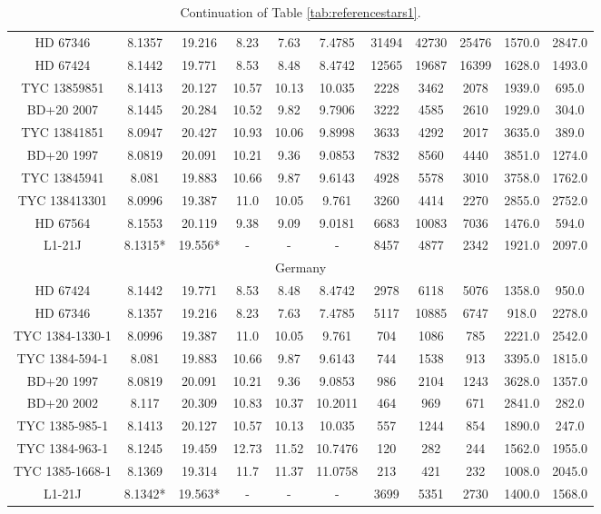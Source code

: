 \begin{table*}
{\begin{tabular}{c|cc|ccc|ccc|cc}
HD 67346 & 8.1357 & 19.216 & 8.23 & 7.63 & 7.4785 & 31494 & 42730 & 25476 & 1570.0 & 2847.0\\HD 67424 & 8.1442 & 19.771 & 8.53 & 8.48 & 8.4742 & 12565 & 19687 & 16399 & 1628.0 & 1493.0\\TYC 13859851 & 8.1413 & 20.127 & 10.57 & 10.13 & 10.035 & 2228 & 3462 & 2078 & 1939.0 & 695.0\\BD+20 2007 & 8.1445 & 20.284 & 10.52 & 9.82 & 9.7906 & 3222 & 4585 & 2610 & 1929.0 & 304.0\\TYC 13841851 & 8.0947 & 20.427 & 10.93 & 10.06 & 9.8998 & 3633 & 4292 & 2017 & 3635.0 & 389.0\\BD+20 1997 & 8.0819 & 20.091 & 10.21 & 9.36 & 9.0853 & 7832 & 8560 & 4440 & 3851.0 & 1274.0\\TYC 13845941 & 8.081 & 19.883 & 10.66 & 9.87 & 9.6143 & 4928 & 5578 & 3010 & 3758.0 & 1762.0\\TYC 138413301 & 8.0996 & 19.387 & 11.0 & 10.05 & 9.761 & 3260 & 4414 & 2270 & 2855.0 & 2752.0\\HD 67564 & 8.1553 & 20.119 & 9.38 & 9.09 & 9.0181 & 6683 & 10083 & 7036 & 1476.0 & 594.0\\L1-21J & 8.1315* & 19.556* & - & - & - & 8457 & 4877 & 2342 & 1921.0 & 2097.0\\
\hline
\multicolumn{11}{c}{Germany}\\
\hline
HD 67424 & 8.1442 & 19.771 & 8.53 & 8.48 & 8.4742 & 2978 & 6118 & 5076 & 1358.0 & 950.0\\HD 67346 & 8.1357 & 19.216 & 8.23 & 7.63 & 7.4785 & 5117 & 10885 & 6747 & 918.0 & 2278.0\\TYC 1384-1330-1 & 8.0996 & 19.387 & 11.0 & 10.05 & 9.761 & 704 & 1086 & 785 & 2221.0 & 2542.0\\TYC 1384-594-1 & 8.081 & 19.883 & 10.66 & 9.87 & 9.6143 & 744 & 1538 & 913 & 3395.0 & 1815.0\\BD+20 1997 & 8.0819 & 20.091 & 10.21 & 9.36 & 9.0853 & 986 & 2104 & 1243 & 3628.0 & 1357.0\\BD+20 2002 & 8.117 & 20.309 & 10.83 & 10.37 & 10.2011 & 464 & 969 & 671 & 2841.0 & 282.0\\TYC 1385-985-1 & 8.1413 & 20.127 & 10.57 & 10.13 & 10.035 & 557 & 1244 & 854 & 1890.0 & 247.0\\TYC 1384-963-1 & 8.1245 & 19.459 & 12.73 & 11.52 & 10.7476 & 120 & 282 & 244 & 1562.0 & 1955.0\\TYC 1385-1668-1 & 8.1369 & 19.314 & 11.7 & 11.37 & 11.0758 & 213 & 421 & 232 & 1008.0 & 2045.0\\L1-21J & 8.1342* & 19.563* & - & - & - & 3699 & 5351 & 2730 & 1400.0 & 1568.0\\
\hline\hline
\end{tabular}}
\caption{Continuation of Table \ref{tab:referencestars1}.\label{tab:referencestars2}}
\end{table*}
